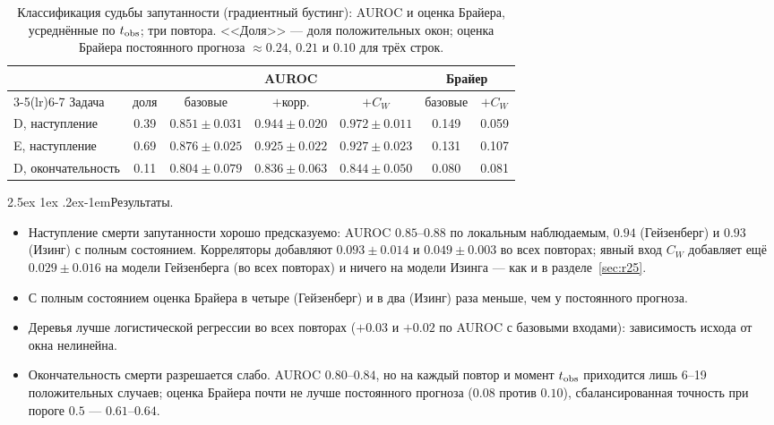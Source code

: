 \documentclass[12pt,a4paper]{report}
\makeatletter
\renewcommand\paragraph{\@startsection{paragraph}{4}{\z@}%
  {2.5ex \@plus1ex \@minus.2ex}{-1em}{\normalfont\normalsize\bfseries}}
\numberwithin{equation}{chapter}
\makeatother
\begin{document}
\begin{table}[h]
\centering
\caption{Классификация судьбы запутанности (градиентный бустинг): AUROC и
оценка Брайера, усреднённые по $t_{\rm obs}$; три повтора. <<Доля>> ---
доля положительных окон; оценка Брайера постоянного прогноза
$\approx0.24$, $0.21$ и $0.10$ для трёх строк.}
\label{tab:r26}
\small
\begin{tabular}{@{}lcccccc@{}}
\toprule
 & & \multicolumn{3}{c}{AUROC} & \multicolumn{2}{c}{Брайер} \\
\cmidrule(lr){3-5}\cmidrule(lr){6-7}
Задача & доля & базовые & $+$корр. & $+C_W$ & базовые & $+C_W$ \\
\midrule
D, наступление & 0.39 & $0.851\pm0.031$ & $0.944\pm0.020$ & $\mathbf{0.972\pm0.011}$ & 0.149 & 0.059 \\
E, наступление & 0.69 & $0.876\pm0.025$ & $\mathbf{0.925\pm0.022}$ & $\mathbf{0.927\pm0.023}$ & 0.131 & 0.107 \\
D, окончательность & 0.11 & $0.804\pm0.079$ & $0.836\pm0.063$ & $0.844\pm0.050$ & 0.080 & 0.081 \\
\bottomrule
\end{tabular}
\end{table}

\paragraph{Результаты.}
\begin{itemize}
\item Наступление смерти запутанности хорошо предсказуемо: AUROC
      $0.85$--$0.88$ по локальным наблюдаемым, $0.94$ (Гейзенберг) и $0.93$
      (Изинг) с полным состоянием. Корреляторы добавляют $0.093\pm0.014$ и
      $0.049\pm0.003$ во всех повторах; явный вход $C_W$ добавляет ещё
      $0.029\pm0.016$ на модели Гейзенберга (во всех повторах) и ничего на
      модели Изинга --- как и в разделе~\ref{sec:r25}.
\item С полным состоянием оценка Брайера в четыре (Гейзенберг) и в два
      (Изинг) раза меньше, чем у постоянного прогноза.
\item Деревья лучше логистической регрессии во всех повторах ($+0.03$ и
      $+0.02$ по AUROC с базовыми входами): зависимость исхода от окна
      нелинейна.
\item Окончательность смерти разрешается слабо. AUROC $0.80$--$0.84$, но на
      каждый повтор и момент $t_{\rm obs}$ приходится лишь 6--19
      положительных случаев; оценка Брайера почти не лучше постоянного
      прогноза ($0.08$ против $0.10$), сбалансированная точность при пороге
      $0.5$ --- $0.61$--$0.64$.
\end{itemize}
\end{document}
